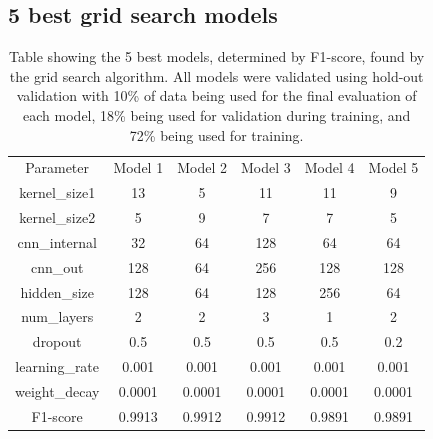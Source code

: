 \documentclass[11pt,a4paper]{article}
\begin{document}
\subsection{5 best grid search models}
\label{app:gridsearch}
\begin{table}[h]
    \centering
    \begin{tabular}{c|c|c|c|c|c}
        Parameter    & Model 1 & Model 2 & Model 3 & Model 4 & Model 5 \\
        kernel\_size1 & 13     & 5       & 11      & 11      & 9       \\
        kernel\_size2 & 5      & 9       & 7       & 7       & 5       \\
        cnn\_internal & 32     & 64      & 128     & 64      & 64      \\
        cnn\_out      & 128    & 64      & 256     & 128     & 128     \\
        hidden\_size  & 128    & 64      & 128     & 256     & 64      \\
        num\_layers   & 2      & 2       & 3       & 1       & 2       \\
        dropout       & 0.5    & 0.5     & 0.5     & 0.5     & 0.2     \\
        learning\_rate& 0.001  & 0.001   & 0.001   & 0.001   & 0.001   \\
        weight\_decay & 0.0001 & 0.0001  & 0.0001  & 0.0001  & 0.0001  \\
        F1-score      & 0.9913 & 0.9912  & 0.9912  & 0.9891  & 0.9891 
    \end{tabular}
    \caption{Table showing the 5 best models, determined by F1-score, found by the grid search algorithm. All models were validated using hold-out validation with 10\% of data being used for the final evaluation of each model, 18\% being used for validation during training, and 72\% being used for training.}
    \label{tab:app_gridsearch}
\end{table}
\end{document}
